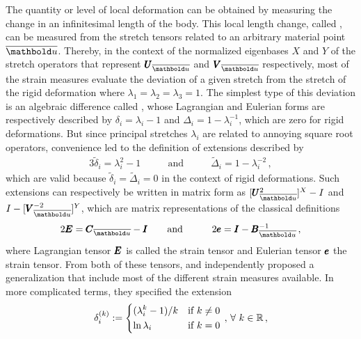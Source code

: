 The quantity or level of local deformation can be obtained by measuring the change in an infinitesimal length of the body. This local length change, called , can be measured from the stretch tensors related to an arbitrary material point $\overline{\vto{u}}$. Thereby, in the context of the normalized eigenbases $X$ and $Y$ of the stretch operators that represent $\tnr{U}_{\overline{\vto{u}}}$ and $\tnr{V}_{\overline{\vto{u}}}$ respectively, most of the strain measures evaluate the deviation of a given stretch from the stretch of the rigid deformation where $\lambda_1=\lambda_2=\lambda_3=1$. The simplest type of this deviation is an algebraic difference called , whose Lagrangian and Eulerian forms are respectively described by $\delta_i=\lambda_i-1$ and $\Delta_i=1-\lambda_i^{-1}$, which are zero for rigid deformations. But since principal stretches $\lambda_i$ are related to annoying square root operators, convenience led to the definition of extensions described by 
\begin{alignat}{3}
\tilde{\delta}_i=\lambda_i^2-1&\qquad \text{and}\qquad & \tilde{\Delta}_i=1-\lambda_i^{-2}\,,
\end{alignat}
which are valid because $\tilde{\delta}_i=\tilde{\Delta}_i=0$ in the context of rigid deformations. Such extensions can respectively be written in matrix form as $[\tnr{U}_{\overline{\vto{u}}}^2]^X-I$ and $I-[\tnr{V}_{\overline{\vto{u}}}^{-2}]^Y$, which are matrix representations of the classical definitions 
\begin{alignat}{3}
2\tnr{E}=\tnr{C}_{\overline{\vto{u}}}-\tnr{I}&\qquad \text{and}\qquad & 2\tnr{e}=\tnr{I}-\tnr{B}_{\overline{\vto{u}}}^{-1}\,,
\end{alignat}
where Lagrangian tensor $\pmb{E}$ is called the  strain tensor and Eulerian tensor $\pmb{e}$ the  strain tensor. From both of these tensors, \cite{doyle_1956} and \cite{seth_1961} independently proposed a generalization that include most of the different strain measures available. In more complicated terms, they specified the extension
\begin{alignat}{3}
\delta_i^{(k)}:=\begin{dcases}
(\lambda_i^k-1)/k &  \text{if } k\neq 0\\
\ln{\lambda_i}&  \text{if } k=0
\end{dcases}\,,\, \forall \,\, k\in\mathbb{R}\,,
\end{alignat}
